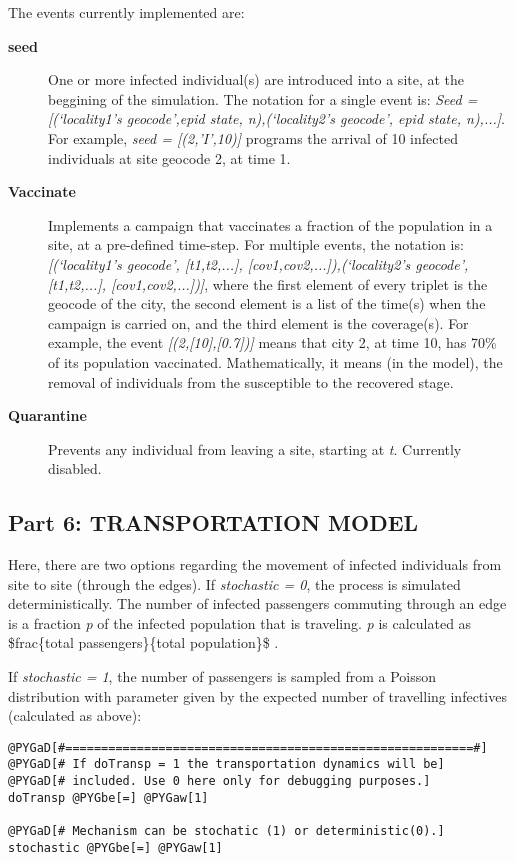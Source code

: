 \documentclass[a4paper,10pt]{manual}
\begin{document}
The events currently implemented are:
\begin{description}
\item[\textbf{seed}]
One or more infected individual(s) are introduced into a site, at the beggining of the simulation. The notation for a single event is: \emph{Seed = {[}(`locality1's geocode',epid state, n),(`locality2's geocode', epid state, n),...{]}}. For example, \emph{seed = {[}(2,'I',10){]}} programs the arrival of 10 infected individuals at site geocode 2, at time 1.

\item[\textbf{Vaccinate}]
Implements a campaign that vaccinates a fraction of the population in a site, at a pre-defined time-step. For multiple events, the notation is: \emph{{[}(`locality1's geocode', {[}t1,t2,...{]}, {[}cov1,cov2,...{]}),(`locality2's geocode', {[}t1,t2,...{]}, {[}cov1,cov2,...{]}){]}}, where the first element of every triplet is the geocode of the city, the second element is a list of the time(s) when the campaign is carried on, and the third element is the coverage(s). For example, the event \emph{{[}(2,{[}10{]},{[}0.7{]}){]}} means that city 2, at time 10, has 70\% of its population vaccinated. Mathematically, it means (in the model), the removal of individuals from the susceptible to the recovered stage.

\item[\textbf{Quarantine}]
Prevents any individual from leaving a site, starting at \emph{t}. Currently disabled.

\end{description}


\subsection{Part 6: TRANSPORTATION MODEL}

Here, there are two options regarding the movement of infected individuals from site to site (through the edges). If \emph{stochastic = 0}, the process is simulated deterministically. The number of infected passengers commuting through an edge is a fraction \emph{p} of the infected population that is traveling. \emph{p} is calculated as \$frac\{total passengers\}\{total population\}\$ .

If \emph{stochastic = 1}, the number of passengers is sampled from a Poisson distribution with parameter given by the expected number of travelling infectives (calculated as above):

\begin{Verbatim}[commandchars=@\[\]]
@PYGaD[#=========================================================#]
@PYGaD[# If doTransp = 1 the transportation dynamics will be]
@PYGaD[# included. Use 0 here only for debugging purposes.]
doTransp @PYGbe[=] @PYGaw[1]

@PYGaD[# Mechanism can be stochatic (1) or deterministic(0).]
stochastic @PYGbe[=] @PYGaw[1]
\end{Verbatim}
\end{document}
